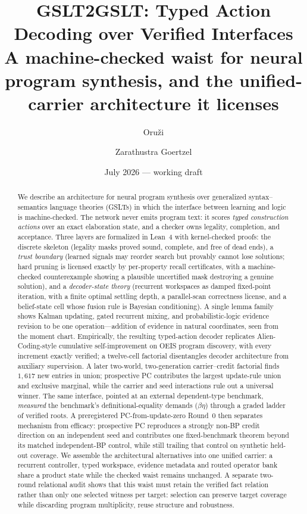 \documentclass[11pt]{article}
\title{GSLT2GSLT: Typed Action Decoding over Verified Interfaces\\
\large A machine-checked waist for neural program synthesis, and the unified-carrier
architecture it licenses}
\author{Oru\v{z}i \and Zarathustra Goertzel}
\date{July 2026 --- working draft}
\begin{document}
\maketitle

\begin{abstract}
We describe an architecture for neural program synthesis over generalized
syntax--semantics language theories (GSLTs) in which the interface between learning and
logic is machine-checked. The network never emits program text: it scores \emph{typed
construction actions} over an exact elaboration state, and a checker owns legality,
completion, and acceptance. Three layers are formalized in Lean~4 with kernel-checked
proofs: the discrete skeleton (legality masks proved sound, complete, and free of dead
ends), a \emph{trust boundary} (learned signals may reorder search but provably cannot
lose solutions; hard pruning is licensed exactly by per-property recall certificates,
with a machine-checked counterexample showing a plausible uncertified mask destroying a
genuine solution), and a \emph{decoder-state theory} (recurrent workspaces as damped
fixed-point iteration, with a finite optimal settling depth, a parallel-scan correctness
license, and a belief-state cell whose fusion rule is Bayesian conditioning). A single
lemma family shows Kalman updating, gated recurrent mixing, and probabilistic-logic
evidence revision to be one operation---addition of evidence in natural coordinates,
seen from the moment chart. Empirically, the resulting typed-action decoder replicates
Alien-Coding-style cumulative self-improvement on OEIS program discovery, with every
increment exactly verified; a twelve-cell factorial disentangles decoder architecture
from auxiliary supervision. A later two-world, two-generation carrier--credit factorial
finds $1{,}617$ new entries in union; prospective PC contributes the largest
update-rule union and exclusive marginal, while the carrier and seed interactions rule
out a universal winner. The same interface, pointed at an external dependent-type
benchmark, \emph{measured} the benchmark's definitional-equality demands
($\beta\eta$) through a graded ladder of verified roots. A preregistered
PC-from-update-zero Round~0 then separates mechanism from efficacy: prospective PC
reproduces a strongly non-BP credit direction on an independent seed and contributes one
fixed-benchmark theorem beyond its matched independent-BP control, while still trailing
that control on synthetic held-out coverage. We assemble the architectural alternatives
into one unified carrier:
a recurrent controller, typed workspace, evidence metadata and routed operator bank
share a product state while the checked waist remains unchanged.
A separate two-round relational audit shows that this waist must retain the verified
fact relation rather than only one selected witness per target: selection can preserve
target coverage while discarding program multiplicity, reuse structure and robustness.
\end{abstract}
\end{document}
